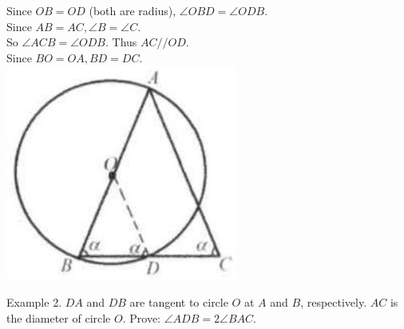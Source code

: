 \documentclass[10pt]{article}
\begin{document}
Since \(O B=O D\) (both are radius), \(\angle O B D=\angle O D B\).\\
Since \(A B=A C, \angle B=\angle C\).\\
So \(\angle A C B=\angle O D B\). Thus \(A C / / O D\).\\
Since \(B O=O A, B D=D C\).\\
\includegraphics[max width=\textwidth, center]{2025_04_17_97bc1f7e44d93c271a88g-147(1)}

Example 2. \(D A\) and \(D B\) are tangent to circle \(O\) at \(A\) and \(B\), respectively. \(A C\) is the diameter of circle \(O\). Prove: \(\angle A D B=2 \angle B A C\).
\end{document}
